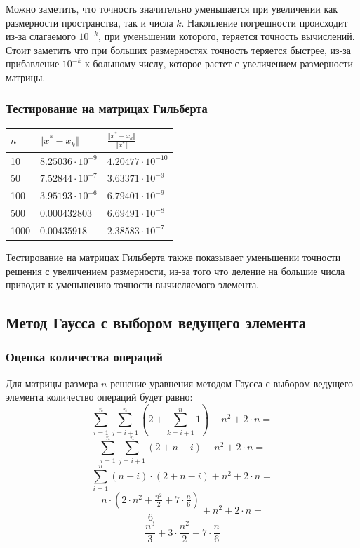 \documentclass[english]{article}
\begin{document}
Можно заметить, что точность значительно уменьшается при увеличении
как размерности пространства, так и числа \(k\). Накопление
погрешности происходит из-за слагаемого \(10^{-k}\), при уменьшении
которого, теряется точность вычислений. Стоит заметить что при больших
размерностях точность теряется быстрее, из-за прибавление \(10^{-k}\)
к большому числу, которое растет с увеличением размерности матрицы.

\subsubsection{Тестирование на матрицах Гильберта}
\begin{center}
  \begin{longtable}{l|l|l}
    \(n\) & \(\Vert x^* - x_k \Vert\) & \(\frac{\Vert x^* - x_k \Vert}{\Vert x^* \Vert}\) \\
    \hline
    10 & \(8.25036\cdot 10^{-9}\) & \(4.20477\cdot 10^{-10}\) \\
    50 & \(7.52844\cdot 10^{-7}\) & \(3.63371\cdot 10^{-9}\) \\
    100 & \(3.95193\cdot 10^{-6}\) & \(6.79401\cdot 10^{-9}\) \\
    500 & \(0.000432803\) & \(6.69491\cdot 10^{-8}\) \\
    1000 & \(0.00435918 \) & \(2.38583\cdot 10^{-7}\)
  \end{longtable}
\end{center}

Тестирование на матрицах Гильберта также показывает уменьшении
точности решения с увеличением размерности, из-за того что деление на
большие числа приводит к уменьшению точности вычисляемого элемента.

\subsection{Метод Гаусса с выбором ведущего элемента}
\subsubsection{Оценка количества операций}
Для матрицы размера \(n\) решение уравнения методом Гаусса с выбором ведущего элемента количество операций будет равно:
\[ \sum_{i=1}^{n} \sum_{j=i + 1}^{n} (2 + \sum_{k=i+1}^{n} 1) + n^2 + 2\cdot n =\]
\[ \sum_{i=1}^{n} \sum_{j=i + 1}^{n} (2 + n - i) + n^2 + 2\cdot n =\]
\[ \sum_{i=1}^{n} (n - i)\cdot (2 + n - i) + n^2 + 2\cdot n =\]
\[ \frac{n \cdot (2 \cdot n^2 + \frac{n^2}{2} + 7 \cdot \frac{n}{6})}{6} + n^2 + 2 \cdot n =\]
\[ \frac{n^3}{3} + 3 \cdot \frac{n^2}{2} + 7 \cdot \frac{n}{6}\]
\end{document}
